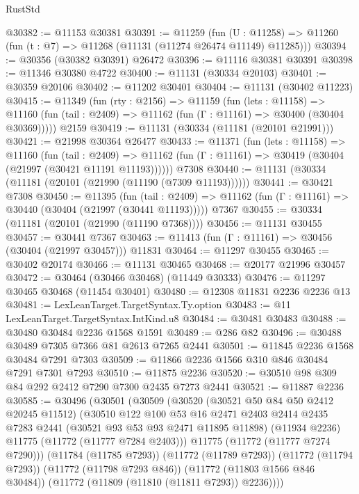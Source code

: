\begin{lexlean}{RustStd}
\begin{coremodule}
@30382 := @11153 @30381
@30391 := @11259
    (fun (U : @11258) => @11260 (fun (t : @7) => @11268 (@11131 (@11274 @26474 @11149) @11285)))
@30394 := @30356 (@30382 @30391) @26472
@30396 := @11116 @30381 @30391
@30398 := @11346 @30380 @4722
@30400 := @11131 (@30334 @20103)
@30401 := @30359 @20106
@30402 := @11202 @30401
@30404 := @11131 (@30402 @11223)
@30415 := @11349
    (fun (rty : @2156) =>
    @11159
      (fun (lets : @11158) =>
      @11160 (fun (tail : @2409) => @11162 (fun (Γ : @11161) => @30400 (@30404 @30369)))))
    @2159
@30419 := @11131 (@30334 (@11181 (@20101 @21991)))
@30421 := @21998 @30364 @26477
@30433 := @11371
    (fun (lets : @11158) =>
    @11160
      (fun (tail : @2409) =>
      @11162 (fun (Γ : @11161) => @30419 (@30404 (@21997 (@30421 @11191 @11193))))))
    @7308
@30440 := @11131 (@30334 (@11181 (@20101 (@21990 (@11190 (@7309 @11193))))))
@30441 := @30421 @7308
@30450 := @11395
    (fun (tail : @2409) => @11162 (fun (Γ : @11161) => @30440 (@30404 (@21997 (@30441 @11193)))))
    @7367
@30455 := @30334 (@11181 (@20101 (@21990 (@11190 @7368))))
@30456 := @11131 @30455
@30457 := @30441 @7367
@30463 := @11413 (fun (Γ : @11161) => @30456 (@30404 (@21997 @30457))) @11831
@30464 := @11297 @30455
@30465 := @30402 @20174
@30466 := @11131 @30465
@30468 := @20177 @21996 @30457
@30472 := @30464 (@30466 @30468) (@11449 @30333)
@30476 := @11297 @30465 @30468 (@11454 @30401)
@30480 := @12308 @11831 @2236 @2236 @13
@30481 := LexLeanTarget.TargetSyntax.Ty.option
@30483 := @11 LexLeanTarget.TargetSyntax.IntKind.u8
@30484 := @30481 @30483
@30488 := @30480 @30484 @2236 @1568 @1591
@30489 := @286 @82
@30496 := @30488 @30489 @7305 @7366 @81 @2613 @7265 @2441
@30501 := @11845 @2236 @1568 @30484 @7291 @7303
@30509 := @11866 @2236 @1566 @310 @846 @30484 @7291 @7301 @7293
@30510 := @11875 @2236
@30520 := @30510 @98 @309 @84 @292 @2412 @7290 @7300 @2435 @7273 @2441
@30521 := @11887 @2236
@30585 := @30496
    (@30501
      (@30509
        (@30520
          (@30521 @50 @84 @50 @2412 @20245 @11512)
          (@30510
            @122
            @100
            @53
            @16
            @2471
            @2403
            @2414
            @2435
            @7283
            @2441
            (@30521 @93 @53 @93 @2471 @11895 @11898)
            (@11934 @2236)
            @11775
            (@11772 (@11777 @7284 @2403)))
          @11775
          (@11772 (@11777 @7274 @7290)))
        (@11784 (@11785 @7293))
        (@11772 (@11789 @7293))
        (@11772 (@11794 @7293))
        (@11772 (@11798 @7293 @846))
        (@11772 (@11803 @1566 @846 @30484))
        (@11772 (@11809 (@11810 (@11811 @7293)) @2236))))

\end{coremodule}
\end{lexlean}
